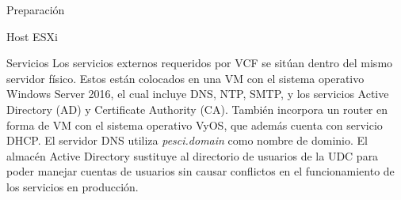 \begin{subsection}{Preparación}
\begin{subsubsection}{Host ESXi}
  \end{subsubsection}

  \begin{subsubsection}{Servicios}
    Los servicios externos requeridos por VCF se sitúan dentro del mismo servidor físico. Estos están colocados en una VM con el sistema operativo Windows Server 2016, el cual incluye DNS, NTP, SMTP, y los servicios Active Directory (AD) y Certificate Authority (CA). También incorpora un router en forma de VM con el sistema operativo VyOS, que además cuenta con servicio DHCP. El servidor DNS utiliza \textit{pesci.domain} como nombre de dominio. El almacén Active Directory sustituye al directorio de usuarios de la UDC para poder manejar cuentas de usuarios sin causar conflictos en el funcionamiento de los servicios en producción.

\end{subsubsection}
\end{subsection}
